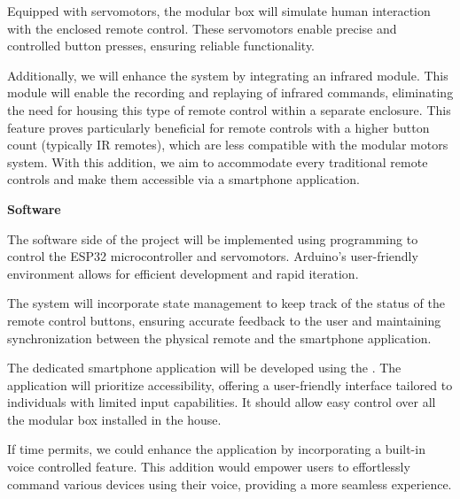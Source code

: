 Equipped with servomotors, the modular box will simulate human interaction with the enclosed remote control.
These servomotors enable precise and controlled button presses, ensuring reliable functionality.

Additionally, we will enhance the system by integrating an infrared module.
This module will enable the recording and replaying of infrared commands, eliminating the need for housing this type of remote control within a separate enclosure.
This feature proves particularly beneficial for remote controls with a higher button count (typically IR remotes), which are less compatible with the modular motors system.
With this addition, we aim to accommodate every traditional remote controls and make them accessible via a smartphone application.


\textbf{Software}

The software side of the project will be implemented using  programming to control the ESP32 microcontroller and servomotors.
Arduino's user-friendly environment allows for efficient development and rapid iteration.

The system will incorporate state management to keep track of the status of the remote control buttons, ensuring accurate feedback to the user and maintaining synchronization between the physical remote and the smartphone application.

The dedicated smartphone application will be developed using the .
The application will prioritize accessibility, offering a user-friendly interface tailored to individuals with limited input capabilities.
It should allow easy control over all the modular box installed in the house.

If time permits, we could enhance the application by incorporating a built-in voice controlled feature.
This addition would empower users to effortlessly command various devices using their voice, providing a more seamless experience.

